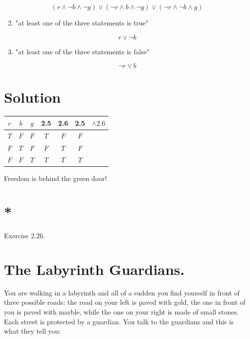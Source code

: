 \documentclass[10pt]{article}
\begin{document}
\begin{equation*}
(r \wedge \neg b \wedge \neg g) \vee(\neg r \wedge b \wedge \neg g) \vee(\neg r \wedge \neg b \wedge g) \tag{2.4}
\end{equation*}


\begin{enumerate}
  \setcounter{enumi}{1}
  \item "at least one of the three statements is true"
\end{enumerate}


\begin{equation*}
r \vee \neg b \tag{2.5}
\end{equation*}


\begin{enumerate}
  \setcounter{enumi}{2}
  \item "at least one of the three statements is false"
\end{enumerate}


\begin{equation*}
\neg r \vee b \tag{2.6}
\end{equation*}


\section*{Solution}
\begin{center}
\begin{tabular}{|c|c|c||c|c|c|c|}
\hline
$r$ & $b$ & $g$ & 2.5 & 2.6 & 2.5 & $\wedge 2.6$ \\
\hline\hline
$T$ & $F$ & $F$ & $T$ & $F$ & $F$ &  \\
$F$ & $T$ & $F$ & $F$ & $T$ & $F$ &  \\
$F$ & $F$ & $T$ & $T$ & $T$ & $T$ &  \\
\hline
\end{tabular}
\end{center}

Freedom is behind the green door!

\section*{*}
Exercise 2.26.

\section*{The Labyrinth Guardians.}
You are walking in a labyrinth and all of a sudden you find yourself in front of three possible roads: the road on your left is paved with gold, the one in front of you is paved with marble, while the one on your right is made of small stones. Each street is protected by a guardian. You talk to the guardians and this is what they tell you:
\end{document}
